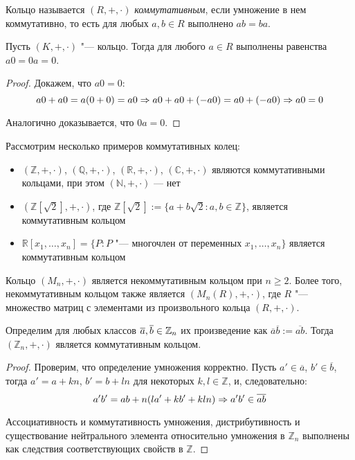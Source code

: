 \begin{definition}
	Кольцо называется $(R, +, \cdot)$ \textit{коммутативным}, если умножение в нем коммутативно, то есть для любых $a, b \in R$ выполнено $ab = ba$.
\end{definition}

\begin{proposition}
	Пусть $(K, +, \cdot)$ "--- кольцо. Тогда для любого $a \in R$ выполнены равенства $a0 = 0a = 0$.
\end{proposition}

\begin{proof}
	Докажем, что $a0 = 0$:
	\[a0 + a0 = a(0 + 0) = a0 \Rightarrow a0 + a0 + (-a0) = a0 + (-a0) \Rightarrow a0 = 0\]
	
	Аналогично доказывается, что $0a = 0$.
\end{proof}

\begin{example}
	Рассмотрим несколько примеров коммутативных колец:
	\begin{itemize}
		\item $(\mathbb{Z}, +, \cdot)$, $(\mathbb{Q}, +, \cdot)$, $(\mathbb{R}, +, \cdot)$, $(\mathbb{C}, +, \cdot)$ являются коммутативными кольцами, при этом $(\mathbb{N}, +, \cdot)$ --- нет
		\item $(\mathbb{Z}[\sqrt{2}], +, \cdot)$, где $\mathbb{Z}[\sqrt{2}] := \{a + b\sqrt{2}: a, b \in \mathbb{Z}\}$, является коммутативным кольцом
		\item $\mathbb{R}[x_1, \dotsc, x_n] = \{P: P\text{ "--- многочлен от переменных }x_1, \dotsc, x_n\}$ является коммутативным кольцом
	\end{itemize}
\end{example}

\begin{example}
	Кольцо $(M_n, +, \cdot)$ является некоммутативным кольцом при $n \ge 2$. Более того, некоммутативным кольцом также является $(M_n(R), +, \cdot)$, где $R$ "--- множество матриц с элементами из произвольного кольца $(R, +, \cdot)$.
\end{example}

\begin{proposition}
	Определим для любых классов $\overline a, \overline b \in \mathbb{Z}_n$ их произведение как $\overline{a}\overline{b} := \overline{ab}$. Тогда $(\mathbb{Z}_n, +, \cdot)$ является коммутативным кольцом.
\end{proposition}

\begin{proof}
	Проверим, что определение умножения корректно. Пусть $a' \in \overline{a}$, $b' \in \overline{b}$, тогда $a' = a + kn$, $b' = b + ln$ для некоторых $k, l \in \mathbb{Z}$, и, следовательно:
	\[a'b' = ab + n(la' + kb' + kln) \Rightarrow a'b' \in \overline{ab}\]
	
	Ассоциативность и коммутативность умножения, дистрибутивность и существование нейтрального элемента относительно умножения в $\mathbb{Z}_n$ выполнены как следствия соответствующих свойств в $\mathbb{Z}$.
\end{proof}

